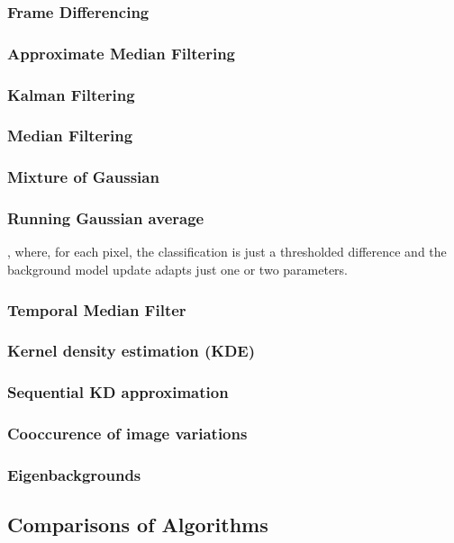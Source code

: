 \subsubsection{Frame Differencing}
\subsubsection{Approximate Median Filtering} \subsubsection{Kalman Filtering}
\subsubsection{Median Filtering}
\subsubsection{Mixture of Gaussian}
\subsubsection{Running Gaussian average}
, where,
for
each
pixel,
the
classification is
just
a thresholded difference and the
background model update adapts
just
one
or
two
parameters.
\subsubsection{Temporal Median Filter}
\subsubsection{Kernel density estimation (KDE)}
\subsubsection{Sequential KD approximation}
\subsubsection{Cooccurence of image variations}
\subsubsection{Eigenbackgrounds}

\subsection{Comparisons of Algorithms}
\label{research: person isolation: comparisons}

